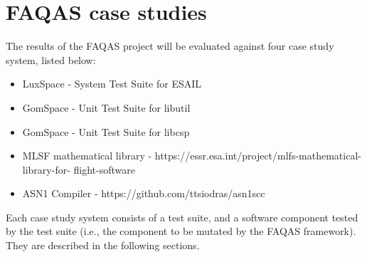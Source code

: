 
\chapter{FAQAS case studies}
\label{chapter:caseStudies}

The results of the FAQAS project will be evaluated against four case study system, listed below:

\begin{itemize}
	\item LuxSpace - System Test Suite for ESAIL
	\item GomSpace - Unit Test Suite for libutil
	\item GomSpace - Unit Test Suite for libcsp
	\item MLSF mathematical library - https://essr.esa.int/project/mlfs-mathematical-library-for-
		flight-software
	\item ASN1 Compiler - https://github.com/ttsiodras/asn1scc
\end{itemize}

Each case study system consists of a test suite, 
and a software component tested by the test suite (i.e., the component to be mutated by the FAQAS framework). They are described in the following sections. 

\clearpage



